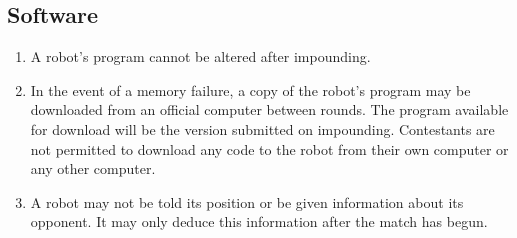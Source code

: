 \subsection{Software}
\begin{enumerate}

\item A robot's program cannot be altered after impounding.

\item In the event of a memory failure, a copy of the robot's program may be
downloaded from an official computer between rounds. The program available for
download will be the version submitted on impounding. Contestants are not
permitted to download any code to the robot from their own computer or any other
computer.

\item A robot may not be told its position or be given information about its
opponent. It may only deduce this information after the match has begun.

\end{enumerate}

